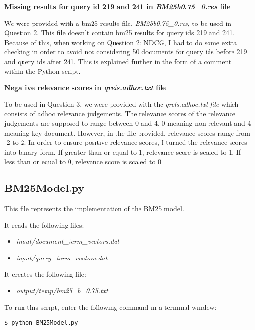 \documentclass{article} %
\begin{document}
\textbf{Missing results for query id 219 and 241 in \textit{BM25b0.75\_0.res} file}

We were provided with a bm25 results file, \textit{BM25b0.75\_0.res}, to be used in Question 2. This file doesn't contain bm25 results for query ids 219 and 241. Because of this, when working on Question 2: NDCG, I had to do some extra checking in order to avoid not considering 50 documents for query ids before 219 and query ids after 241. This is explained further in the form of a comment within the Python script.

\textbf{Negative relevance scores in \textit{qrels.adhoc.txt} file}

To be used in Question 3, we were provided with the \textit{qrels.adhoc.txt file} which consists of adhoc relevance judgements. The relevance scores of the relevance judgements are supposed to range between 0 and 4, 0 meaning non-relevant and 4 meaning key document. However, in the file provided, relevance scores range from -2 to 2. In order to ensure positive relevance scores, I turned the relevance scores into binary form. If greater than or equal to 1, relevance score is scaled to 1. If less than or equal to 0, relevance score is scaled to 0.

\subsection*{BM25Model.py \cite{okapibm25}}

This file represents the implementation of the BM25 model.

It reads the following files:

\begin{itemize}
    \item \textit{input/document\_term\_vectors.dat}
    \item \textit{input/query\_term\_vectors.dat}
\end{itemize}

It creates the following file:

\begin{itemize}
    \item \textit{output/temp/bm25\_b\_0.75.txt}
\end{itemize}

To run this script, enter the following command in a terminal window:

\begin{lstlisting}[style=Bash]
  $ python BM25Model.py
\end{lstlisting}
\end{document}
